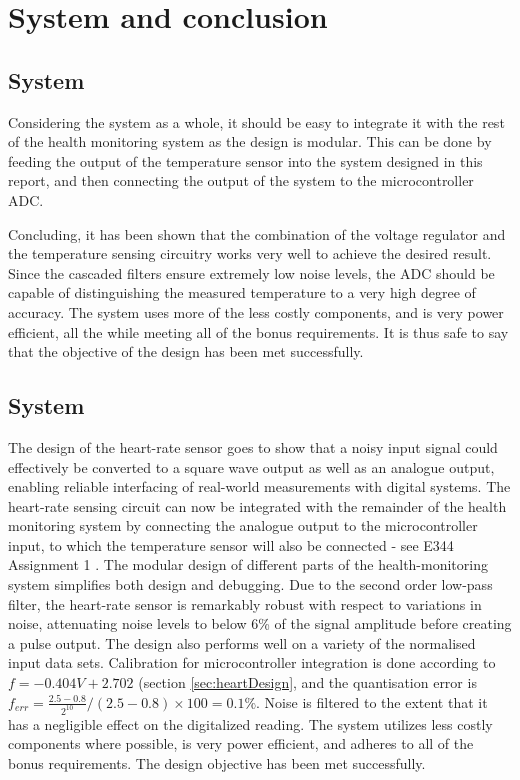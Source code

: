 \chapter{System and conclusion}

\section{System}
Considering the system as a whole, it should be easy to integrate it with the rest of the health monitoring system as the design is modular. This can be done by feeding the output of the temperature sensor into the system designed in this report, and then connecting the output of the system to the microcontroller ADC. 

Concluding, it has been shown that the combination of the voltage regulator and the temperature sensing circuitry works very well to achieve the desired result. Since the cascaded filters ensure extremely low noise levels, the ADC should be capable of distinguishing the measured temperature to a very high degree of accuracy. The system uses more of the less costly components, and is very power efficient, all the while meeting all of the bonus requirements. It is thus safe to say that the objective of the design has been met successfully.

\section{System}
The design of the heart-rate sensor goes to show that a noisy input signal could effectively be converted to a square wave output as well as an analogue output, enabling reliable interfacing of real-world measurements with digital systems. The heart-rate sensing circuit can now be integrated with the remainder of the health monitoring system by connecting the analogue output to the microcontroller input, to which the temperature sensor will also be connected - see E344 Assignment 1 \cite{prev}. The modular design of different parts of the health-monitoring system simplifies both design and debugging. Due to the second order low-pass filter, the heart-rate sensor is remarkably robust with respect to variations in noise, attenuating noise levels to below 6\% of the signal amplitude before creating a pulse output. The design also performs well on a variety of the normalised input data sets. Calibration for microcontroller integration is done according to $f = -0.404V + 2.702$ (section \ref{sec:heartDesign}, and the quantisation error is $f_{err} = \frac{2.5 - 0.8}{2^{10}} / (2.5 - 0.8) \times 100 = 0.1\%$. Noise is filtered to the extent that it has a negligible effect on the digitalized reading.
The system utilizes less costly components where possible, is very power efficient, and adheres to all of the bonus requirements. The design objective has been met successfully.

